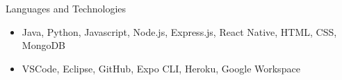 \documentclass[]{mcdowellcv}
\begin{document}

	\begin{cvsection}{Languages and Technologies}
		\begin{cvsubsection}{}{}{}	
			\begin{itemize}
				\item Java, Python, Javascript, Node.js, Express.js, React Native, HTML, CSS, MongoDB
				\item VSCode, Eclipse, GitHub, Expo CLI, Heroku, Google Workspace
			\end{itemize}
		\end{cvsubsection}
	\end{cvsection}
	
\end{document}

